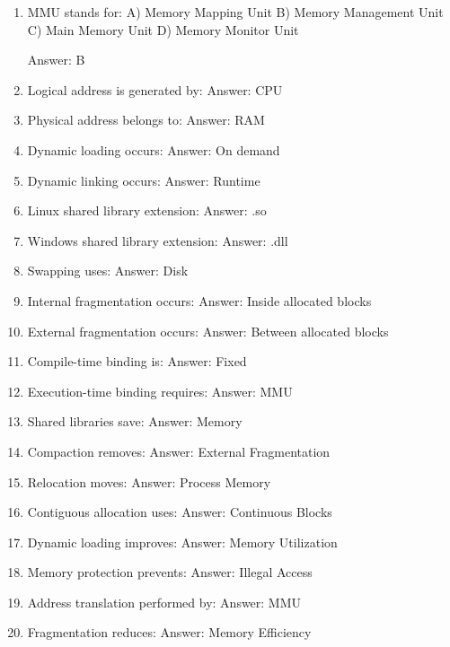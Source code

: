 \begin{enumerate}
\item MMU stands for:
A) Memory Mapping Unit
B) Memory Management Unit
C) Main Memory Unit
D) Memory Monitor Unit

Answer: B

\item Logical address is generated by:
Answer: CPU

\item Physical address belongs to:
Answer: RAM

\item Dynamic loading occurs:
Answer: On demand

\item Dynamic linking occurs:
Answer: Runtime

\item Linux shared library extension:
Answer: .so

\item Windows shared library extension:
Answer: .dll

\item Swapping uses:
Answer: Disk

\item Internal fragmentation occurs:
Answer: Inside allocated blocks

\item External fragmentation occurs:
Answer: Between allocated blocks

\item Compile-time binding is:
Answer: Fixed

\item Execution-time binding requires:
Answer: MMU

\item Shared libraries save:
Answer: Memory

\item Compaction removes:
Answer: External Fragmentation

\item Relocation moves:
Answer: Process Memory

\item Contiguous allocation uses:
Answer: Continuous Blocks

\item Dynamic loading improves:
Answer: Memory Utilization

\item Memory protection prevents:
Answer: Illegal Access

\item Address translation performed by:
Answer: MMU

\item Fragmentation reduces:
Answer: Memory Efficiency
\end{enumerate}


